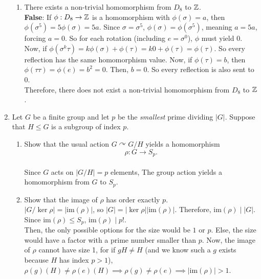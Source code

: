 \documentclass{amsart}
\begin{document}
\begin{enumerate}[itemsep=0.2in]
\begin{enumerate}
    \item There exists a non-trivial homomorphism from $D_8$ to $\mathbb{Z}$.\\

    \textbf{False}: If $\phi:D_8\to\mathbb{Z}$ is a homomorphism with $\phi(\sigma)=a$, then $\phi(\sigma^5)=5\phi(\sigma)=5a$. Since $\sigma=\sigma^5$, $\phi(\sigma)=\phi(\sigma^5)$, meaning $a=5a$, forcing $a=0$. So for each rotation (including $e=\sigma^0$), $\phi$ must yield $0$. \\

    Now, if $\phi(\sigma^k\tau)=k\phi(\sigma)+\phi(\tau)=k0+\phi(\tau)=\phi(\tau)$. So every reflection has the same homomorphism value. Now, if $\phi(\tau)=b$, then $\phi(\tau\tau)=\phi(e)=b^2=0$. Then, $b=0$. So every reflection is also sent to $0$.\\

    Therefore, there does not exist a non-trivial homomorphism from $D_8$ to $\mathbb{Z}$.

    
\end{enumerate}



\item Let $G$ be a finite group and let $p$ be the \emph{smallest} prime dividing $|G|$. Suppose that $H\leq G$ is a subgroup of index $p$.
\begin{enumerate}
	\item Show that the usual action $G \curvearrowright G/H$ yields a homomorphism
	\[
     \rho:G\to S_p.
	\]\\

    Since $G$ acts on $|G/H|=p$ elements, The group action yields a homomorphism from $G$ to $S_p$. \\
    
	\item Show that the image of $\rho$ has order exactly $p$.\\
    

    $|G/\ker\rho|=|\mathrm{im}(\rho)|$, so $|G|=|\ker\rho||\mathrm{im}(\rho)|$. Therefore, $\mathrm{im}(\rho)\mid |G|$. Since $\mathrm{im}(\rho)\leq S_p$, $\mathrm{im}(\rho)\mid p!$.\\
    
    Then, the only possible options for the size would be $1$ or $p$. Else, the size would have a factor with a prime number smaller than $p$. Now, the image of $\rho$ cannot have size 1, for if $gH\neq H$ (and we know such a $g$ exists because $H$ has index $p>1$), $\rho(g)(H)\neq \rho(e)(H)\implies\rho(g)\neq\rho(e)\implies|\mathrm{im}(\rho)|>1$.\\
    

\end{enumerate}
\end{enumerate}
\end{document}
